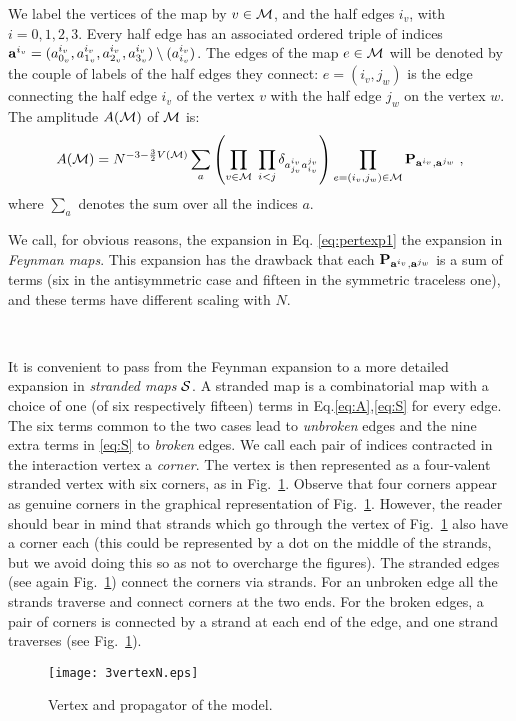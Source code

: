 \documentclass[10pt]{article}
\theoremstyle{plain}
\theoremstyle{definition}
\newcommand{\bP}{ {\bf P} }
\newcommand{\ba}{ {\bf a} }
\newcommand{\cM}{{\cal M}}
\newcommand{\cS}{{\cal S}}
\begin{document}
We label the vertices of the map by $v\in \cM$, and the half edges $i_v$, with $i=0,1,2,3$. Every half edge has an associated ordered triple of indices 
$\ba^{i_v} =( a^{i_v}_{0_v}, a^{i_v}_{1_v} ,  a^{i_v}_{2_v} , a^{i_v}_{3_v} ) \setminus (a^{i_v}_{i_v})$. 
The edges of the map $e\in \cM$ will be denoted by the couple of labels of the half edges they connect: $e=(i_v,j_w)$ is the edge connecting the half edge $i_v$ of the vertex $v$
with the half edge $j_w$ on the vertex $w$. The amplitude $A( {\cal M} )$ of $\cM$ is:
\[
A(\cM) = N^{ -3 -\frac{3}{2} V(\cM) }\sum_{  a } \left( \prod_{v\in \cM} \;  \prod_{  i<j } \delta_{a^{i_v}_{j_v} a^{j_v}_{i_v } } \right) \prod_{e = (i_v,j_w) \in \cM} \bP_{ \ba^{i_v} , \ba^{j_w} } \;,
\]
where $\sum_a$ denotes the sum over all the indices $a$. 

We call, for obvious reasons, the expansion in Eq. \eqref{eq:pertexp1} the expansion in 
\emph{Feynman maps}. This expansion has the drawback that each $\bP_{ \ba^{i_v} , \ba^{j_w} }$ is a sum of terms (six in the antisymmetric case and fifteen in the symmetric traceless one), and 
these terms have different scaling with $N$.

\

It is convenient to pass from the Feynman expansion to a more detailed expansion in \emph{stranded maps} $\cS$. A stranded map is a combinatorial map with a choice of one (of six respectively fifteen) terms 
in Eq.\eqref{eq:A},\eqref{eq:S} for every edge. The six terms common to the two cases lead to \emph{unbroken} edges and the nine extra terms in \eqref{eq:S} to \emph{broken} edges. 
We call each pair of  indices contracted in the interaction vertex a \emph{corner}. The vertex is then represented as a four-valent stranded vertex with six corners, as in Fig.~\ref{fig:vertex}. 
Observe that four corners appear as genuine corners in the graphical representation of Fig.~\ref{fig:vertex}. However, the reader should bear in mind that strands which go through 
the vertex of Fig.~\ref{fig:vertex} also have a corner each (this could be represented by a dot on the middle of the strands, but we 
avoid doing this so as not to overcharge the figures). 
The stranded edges (see again Fig.~\ref{fig:vertex}) connect the corners via strands. For an unbroken edge all the strands 
traverse and connect corners at the two ends. For the broken edges, a pair of corners is connected by a strand at each end of the edge,
and one strand traverses (see Fig.~\ref{fig:vertex}).
 \begin{figure}[htb]
 \begin{center}
 \texttt{[image: 3vertexN.eps]}  
 \caption{Vertex and propagator of the model.} \label{fig:vertex}
 \end{center}
 \end{figure}
 
\end{document}
